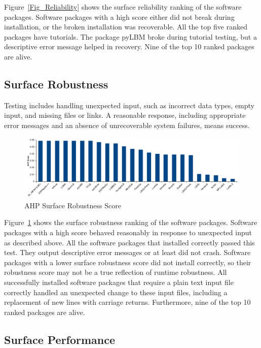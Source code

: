 \documentclass[final, 3p, times, authoryear]{elsarticle}
\begin{document}
Figure~\ref{Fig_Reliability} shows the surface reliability ranking of the
software packages. Software packages with a high score either did not break
during installation, or the broken installation was recoverable. All the top
five ranked packages have tutorials. The package pyLBM broke during tutorial
testing, but a descriptive error message helped in recovery. Nine of the top 10
ranked packages are alive. 

\subsection{Surface Robustness}

Testing includes handling unexpected input, such as incorrect data types, empty
input, and missing files or links. A reasonable response, including appropriate
error messages and an absence of unrecoverable system failures, means success. 

\begin{figure}[h!]
	\begin{center}
		\includegraphics[width=1.0\textwidth]{./figures/robustness_chart.pdf}
		\caption{AHP Surface Robustness Score}
		\label{Fig_Robustness}
	\end{center}
\end{figure}

Figure~\ref{Fig_Robustness} shows the surface robustness ranking of the software
packages. Software packages with a high score behaved reasonably in response to
unexpected input as described above. All the software packages that installed
correctly passed this test. They output descriptive error messages or at least
did not crash. Software packages with a lower surface robustness score did not
install correctly, so their robustness score may not be a true reflection of
runtime robustness. All successfully installed software packages that require a
plain text input file correctly handled an unexpected change to these input
files, including a replacement of new lines with carriage returns. Furthermore,
nine of the top 10 ranked packages are alive.

\subsection{Surface Performance}
\end{document}
